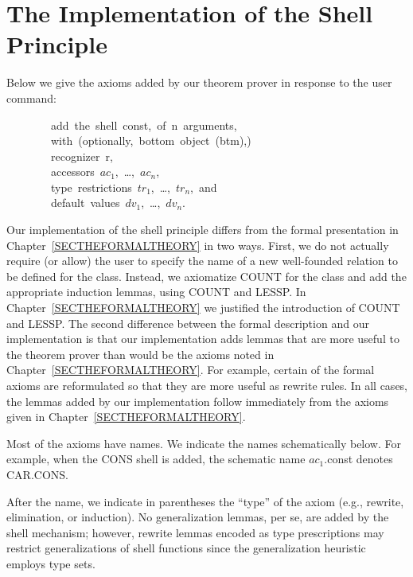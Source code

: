 \documentclass[10pt]{book}
\newenvironment{pubasis}{\begin{flushleft}}{\end{flushleft}}
\begin{document}
\chapter{The Implementation of the Shell Principle}
\pagestyle{headings}
\label{APPSHELL}
Below we give the axioms added by our theorem prover
in response to the user command:
\begin{pubasis}
~~~~~~~~add~the~shell~const,~of~n~arguments,\\
~~~~~~~~with~(optionally,~bottom~object~(btm),)\\
~~~~~~~~recognizer~r,\\
~~~~~~~~accessors~$ac_{1}$,~\ldots{},~$ac_{n}$,\\
~~~~~~~~type~restrictions~$tr_{1}$,~\ldots{},~$tr_{n}$,~and\\
~~~~~~~~default~values~$dv_{1}$,~\ldots{},~$dv_{n}$.\\
\end{pubasis}
Our implementation of the shell principle differs from the formal
presentation in Chapter~\ref{SECTHEFORMALTHEORY} in two ways.  First,
we do not actually require (or allow) the user to specify the
name of a new well-founded relation to be defined for the class.
Instead, we axiomatize COUNT for the class and add the appropriate
induction lemmas, using COUNT and LESSP. In Chapter~\ref{SECTHEFORMALTHEORY}
we justified
the introduction of COUNT and LESSP.  The second difference between the formal
description and our implementation is that our implementation adds
lemmas that are more useful to the theorem prover than would be
the axioms noted in Chapter~\ref{SECTHEFORMALTHEORY}.  For example,
certain of the formal axioms are reformulated so that they are
more useful as rewrite rules.  In all cases, the lemmas added by
our implementation follow immediately from the axioms given
in Chapter~\ref{SECTHEFORMALTHEORY}.

Most of the axioms have names.  We indicate the names schematically
below.  For example, when the CONS shell is added, the schematic
name $ac_{1}$.const  denotes CAR.CONS.

After the name, we indicate in parentheses the ``type'' of
the axiom (e.g., rewrite, elimination, or induction).  No generalization lemmas, per se,
are added by the shell mechanism; however, rewrite lemmas encoded as
type prescriptions may restrict generalizations of shell functions
since the generalization heuristic employs type sets.
\end{document}
